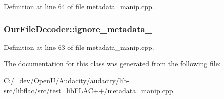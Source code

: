 Definition at line 64 of file metadata\+\_\+manip.\+cpp.

\subsubsection[{\texorpdfstring{ignore\+\_\+metadata\+\_\+}{ignore_metadata_}}]{ Our\+File\+Decoder\+::ignore\+\_\+metadata\+\_\+}\hypertarget{class_our_file_decoder_a1b1df631dd2b9df31b2ce24f34b945bf}{}\label{class_our_file_decoder_a1b1df631dd2b9df31b2ce24f34b945bf}


Definition at line 63 of file metadata\+\_\+manip.\+cpp.



The documentation for this class was generated from the following file\+:\begin{DoxyCompactItemize}
\item 
C\+:/\+\_\+dev/\+Open\+U/\+Audacity/audacity/lib-\/src/libflac/src/test\+\_\+lib\+F\+L\+A\+C++/\hyperlink{metadata__manip_8cpp}{metadata\+\_\+manip.\+cpp}\end{DoxyCompactItemize}
